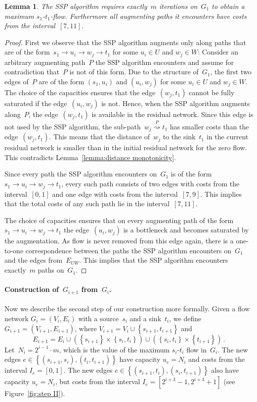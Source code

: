 \documentclass[11pt]{article}
\newtheorem{lemma}[theorem]{Lemma}
\newcommand{\DOT}{\,.}
\newcommand{\SET}[1]{\left\{#1\right\}}
\newcommand{\PATH}[1][]{\stackrel{#1}{\rightsquigarrow}}
\begin{document}
\begin{lemma}
\label{lemma:step I}
The SSP algorithm requires exactly~$m$ iterations on~$G_1$ to obtain a maximum $s_1$-$t_1$-flow. Furthermore all augmenting paths it
encounters have costs from the interval~$[7,11]$.
\end{lemma}
\begin{proof}
First we observe that the SSP algorithm augments only along paths that are of the form~$s_1\to u_i\to w_j\to t_1$ for some $u_i\in U$ and $w_j \in W$:
Consider an arbitrary augmenting path~$P$ the SSP algorithm encounters and assume for contradiction that~$P$ is not of this form.
Due to the structure of~$G_1$, the first two edges of~$P$ are of the form $(s_1,u_i)$ and $(u_i,w_j)$ for some $u_i\in U$ 
and $w_j \in W$. The choice of the capacities ensures that the edge~$(w_j,t_1)$ cannot be fully saturated if the edge~$(u_i,w_j)$ is not.
Hence, when the SSP algorithm augments along~$P$, the edge~$(w_j,t_1)$ is available in the residual network.
Since this edge is not used by the SSP algorithm, the sub-path~$w_j \PATH[P] t_1$ has smaller costs than the edge~$(w_j,t_1)$.
This means that the distance of~$w_j$ to the sink~$t_1$ in the current residual network is smaller than in the initial residual network
for the zero flow. This contradicts Lemma~\ref{lemma:distance monotonicity}.

Since every path the SSP algorithm encounters on~$G_1$ is of the form~$s_1\to u_i\to w_j\to t_1$, every such path consists of two edges with
costs from the interval~$[0,1]$ and one edge with costs from the interval~$[7,9]$. This implies that the total costs of any such path 
lie in the interval~$[7,11]$.

The choice of capacities ensures that on every augmenting path of the form~$s_1\to u_i\to w_j\to t_1$ the edge~$(u_i,w_j)$ is a bottleneck
and becomes saturated by the augmentation. As flow is never removed from this edge again, there is a one-to-one correspondence between
the paths the SSP algorithm encounters on~$G_1$ and the edges from~$E_{UW}$. This implies that the SSP algorithm encounters
exactly~$m$ paths on~$G_1$. 
\end{proof}

\paragraph{\boldmath Construction of~$G_{i+1}$ from~$G_i$.}
Now we describe the second step of our construction more formally. Given a flow network $G_i = (V_i, E_i)$ with a source~$s_i$ and a sink~$t_i$, we define $G_{i+1} = (V_{i+1}, E_{i+1})$, where $V_{i+1} = V_i \cup \SET{ s_{i+1}, t_{i+1} }$ and
\[
  E_{i+1} = E_{i} \cup (\SET{s_{i+1}} \times \SET{ s_i, t_i }) \cup (\SET{ s_i, t_i } \times \SET{t_{i+1}}) \DOT
\]
Let~$N_i = 2^{i-1}\cdot m$, which is the value of the maximum $s_i$-$t_i$ flow in~$G_i$. The new edges $e \in \SET{ (s_{i+1}, s_i), (t_i, t_{i+1}) }$ have capacity $u_e = N_i$ and costs from the interval $I_e = [0, 1]$. The new edges $e \in \SET{ (s_{i+1}, t_i), (s_i, t_{i+1}) }$ also have capacity $u_e = N_i$, but costs from the interval $I_e = [2^{i+3}-1, 2^{i+3}+1]$ (see Figure~\ref{fig:step II}).
\end{document}
